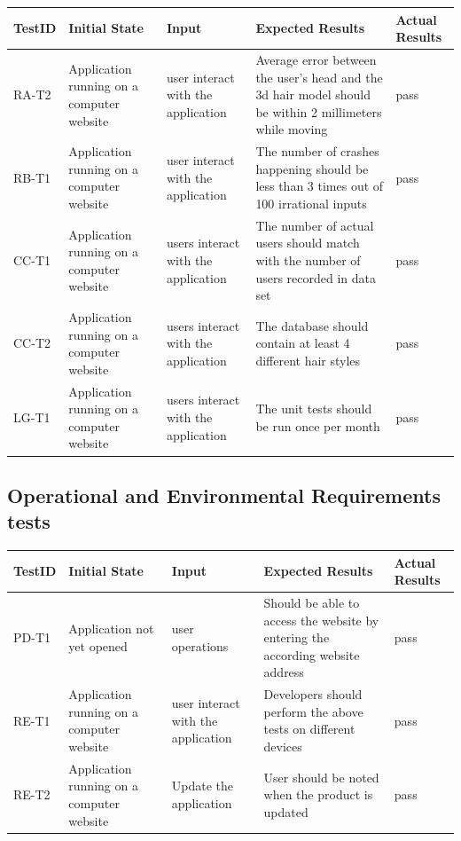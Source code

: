 \documentclass[12pt, titlepage]{article}
\begin{document}
 \begin{tabular}{ |p{2cm}| p{3cm} |p{4cm}| p{4cm}|p{2cm}|  }
\hline
 TestID & Initial State & Input & Expected Results & Actual Results\\ 
 \hline
 RA-T2 & Application running on a computer website & user interact with the application & Average error between the user's head and the 3d hair model should be within 2 millimeters while moving  & pass\\
 \hline
 RB-T1 & Application running on a computer website & user interact with the application & The number of crashes happening should be less than 3 times out of 100 irrational inputs  & pass\\
 \hline
 CC-T1 & Application running on a computer website & users interact with the application & The number of actual users should match with the number of users recorded in data set  & pass\\
  \hline
 CC-T2 & Application running on a computer website & users interact with the application & The database should contain at least 4 different hair styles  & pass\\
  \hline
 LG-T1 & Application running on a computer website & users interact with the application & The unit tests should be run once per month  & pass\\
 \hline
 
\end{tabular}
\subsection{Operational and Environmental Requirements tests}
\begin{tabular}{ |p{2cm}| p{3cm} |p{4cm}| p{4cm}|p{2cm}|  }
\hline
 TestID & Initial State & Input & Expected Results & Actual Results\\ 
 \hline
 PD-T1 & Application not yet opened & user operations & Should be able to access the website by entering the according website address & pass\\
 \hline
 RE-T1 & Application running on a computer website & user interact with the application & Developers should perform the above tests on different devices  & pass\\
 \hline
 RE-T2 & Application running on a computer website & Update the application & User should be noted when the product is updated  & pass\\
 \hline
\end{tabular}
\end{document}
